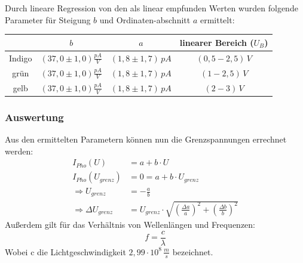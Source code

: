 Durch lineare Regression von den als linear empfunden Werten wurden folgende Parameter für Steigung \(b\) und Ordinaten-abschnitt \(a\) ermittelt:
\begin{center}
\begin{tabular}{c|ccc}
		& \(b\) & \(a\) & linearer Bereich (\(U_B\))\\\hline
Indigo  & \((37,0 \pm 1,0)\frac{pA}{V}\) & \((1,8 \pm 1,7)\,pA\) & \((0,5 - 2,5)\,V\)\\
grün    & \((37,0 \pm 1,0)\frac{pA}{V}\) & \((1,8 \pm 1,7)\,pA\) & \((1 - 2,5)\,V\)\\
gelb    & \((37,0 \pm 1,0)\frac{pA}{V}\) & \((1,8 \pm 1,7)\,pA\) & \((2 - 3)\,V\)
\end{tabular}
\end{center}
\subsubsection{Auswertung}
Aus den ermittelten Parametern können nun die Grenzspannungen errechnet werden:
\begin{align}
I_{Pho}(U) &= a + b \cdot U \\
I_{Pho}(U_{grenz}) &= 0 = a + b \cdot U_{grenz}\\
\Rightarrow U_{grenz} &= - \frac{a}{b}\\
\Rightarrow \Delta U_{grenz} &= U_{grenz} \cdot \sqrt{
\left( \frac{\Delta a}{a} \right)^2 +
\left( \frac{\Delta b}{b} \right)^2
}
\end{align}
Außerdem gilt für das Verhältnis von Wellenlängen und Frequenzen:
\begin{equation}
f = \frac{c}{\lambda}
\end{equation}
Wobei c die Lichtgeschwindigkeit \(2,99 \cdot 10^8\,\frac{m}{s}\) bezeichnet.

